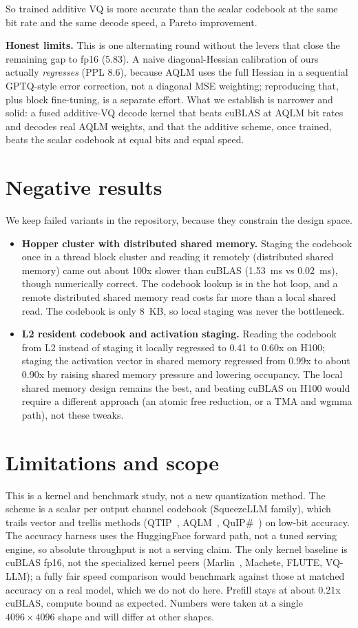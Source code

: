\documentclass[11pt]{article}
\begin{document}
So trained additive VQ is more accurate than the scalar codebook at the same bit rate and
the same decode speed, a Pareto improvement.

\textbf{Honest limits.} This is one alternating round without the levers that close the
remaining gap to fp16 (5.83). A naive diagonal-Hessian calibration of ours actually
\emph{regresses} (PPL 8.6), because AQLM uses the full Hessian in a sequential GPTQ-style
error correction, not a diagonal MSE weighting; reproducing that, plus block fine-tuning,
is a separate effort. What we establish is narrower and solid: a fused additive-VQ decode
kernel that beats cuBLAS at AQLM bit rates and decodes real AQLM weights, and that the
additive scheme, once trained, beats the scalar codebook at equal bits and equal speed.

\section{Negative results}
We keep failed variants in the repository, because they constrain the design space.
\begin{itemize}
  \item \textbf{Hopper cluster with distributed shared memory.} Staging the
        codebook once in a thread block cluster and reading it remotely (distributed
        shared memory) came out about 100x slower than cuBLAS (1.53~ms vs 0.02~ms),
        though numerically correct. The codebook lookup is in the hot loop, and a
        remote distributed shared memory read costs far more than a local shared
        read. The codebook is only 8~KB, so local staging was never the bottleneck.
  \item \textbf{L2 resident codebook and activation staging.} Reading the codebook
        from L2 instead of staging it locally regressed to 0.41 to 0.60x on H100;
        staging the activation vector in shared memory regressed from 0.99x to about
        0.90x by raising shared memory pressure and lowering occupancy. The local
        shared memory design remains the best, and beating cuBLAS on H100 would
        require a different approach (an atomic free reduction, or a TMA and wgmma
        path), not these tweaks.
\end{itemize}

\section{Limitations and scope}
This is a kernel and benchmark study, not a new quantization method. The scheme is
a scalar per output channel codebook (SqueezeLLM family), which trails vector and
trellis methods (QTIP~\cite{qtip}, AQLM~\cite{aqlm}, QuIP\#~\cite{quipsharp}) on
low-bit accuracy. The accuracy harness uses the HuggingFace forward path, not a
tuned serving engine, so absolute throughput is not a serving claim. The only kernel
baseline is cuBLAS fp16, not the specialized kernel peers (Marlin~\cite{marlin},
Machete, FLUTE, VQ-LLM); a fully fair speed comparison would
benchmark against those at matched accuracy on a real model, which we do not do
here. Prefill stays at about 0.21x cuBLAS, compute bound as expected. Numbers were
taken at a single $4096\times4096$ shape and will differ at other shapes.
\end{document}
